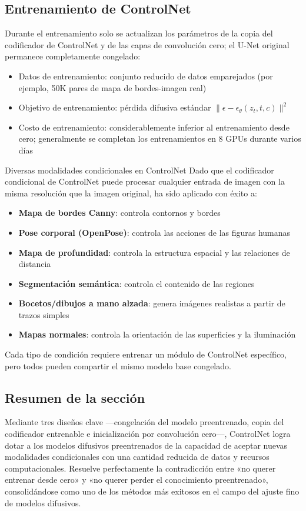 \subsection{Entrenamiento de ControlNet}

Durante el entrenamiento solo se actualizan los parámetros de la copia del codificador de ControlNet y de las capas de convolución cero; el U-Net original permanece completamente congelado:

\begin{itemize}
    \item Datos de entrenamiento: conjunto reducido de datos emparejados (por ejemplo, 50K pares de mapa de bordes-imagen real)
    \item Objetivo de entrenamiento: pérdida difusiva estándar $\|\epsilon - \epsilon_\theta(z_t, t, c)\|^2$
    \item Costo de entrenamiento: considerablemente inferior al entrenamiento desde cero; generalmente se completan los entrenamientos en 8 GPUs durante varios días
\end{itemize}

\begin{knowledgebox}{Diversas modalidades condicionales en ControlNet}
Dado que el codificador condicional de ControlNet puede procesar cualquier entrada de imagen con la misma resolución que la imagen original, ha sido aplicado con éxito a:
\begin{itemize}
    \item \textbf{Mapa de bordes Canny}: controla contornos y bordes
    \item \textbf{Pose corporal (OpenPose)}: controla las acciones de las figuras humanas
    \item \textbf{Mapa de profundidad}: controla la estructura espacial y las relaciones de distancia
    \item \textbf{Segmentación semántica}: controla el contenido de las regiones
    \item \textbf{Bocetos/dibujos a mano alzada}: genera imágenes realistas a partir de trazos simples
    \item \textbf{Mapas normales}: controla la orientación de las superficies y la iluminación
\end{itemize}
Cada tipo de condición requiere entrenar un módulo de ControlNet específico, pero todos pueden compartir el mismo modelo base congelado.
\end{knowledgebox}

\subsection{Resumen de la sección}

Mediante tres diseños clave —congelación del modelo preentrenado, copia del codificador entrenable e inicialización por convolución cero—, ControlNet logra dotar a los modelos difusivos preentrenados de la capacidad de aceptar nuevas modalidades condicionales con una cantidad reducida de datos y recursos computacionales. Resuelve perfectamente la contradicción entre «no querer entrenar desde cero» y «no querer perder el conocimiento preentrenado», consolidándose como uno de los métodos más exitosos en el campo del ajuste fino de modelos difusivos.

\newpage
